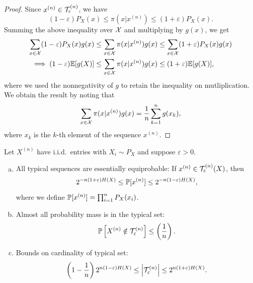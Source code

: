 \documentclass[11pt,a4paper]{article}
\begin{document}
\begin{proof}
    Since $x^{(n)}\in\mathcal{T}^{(n)}_\varepsilon$, we have
    \begin{equation*}
        (1-\varepsilon) P_X(x) \le \pi(x|x^{(n)}) \le (1+\varepsilon) P_X(x).
    \end{equation*}
    Summing the above inequality over $\mathcal{X}$ and multiplying by $g(x)$, we get 
    \begin{align*}
        \sum_{x\in\mathcal{X}} (1-\varepsilon) P_X(x) g(x) &\le \sum_{x\in\mathcal{X}} \pi(x|x^{(n)}) g(x) \le \sum_{x\in\mathcal{X}} (1+\varepsilon) P_X(x) g(x) \\
        \implies (1-\varepsilon) \mathbb{E}[g(X)] &\le \sum_{x\in\mathcal{X}} \pi(x|x^{(n)}) g(x) \le (1+\varepsilon) \mathbb{E}[g(X)],
    \end{align*} 
    where we used the nonnegativity of $g$ to retain the inequality on mutliplication. We obtain the result by noting that
    \begin{equation*}
        \sum_{x\in\mathcal{X}} \pi(x|x^{(n)}) g(x) = \dfrac{1}{n} \sum_{k=1}^n g(x_k),
    \end{equation*}
    where $x_k$ is the $k$-th element of the sequence $x^{(n)}$.
\end{proof}

\begin{theorem}\label{thm:typicality}
    Let $X^{(n)}$ have i.i.d.~entries with $X_i\sim P_X$ and suppose $\varepsilon>0$.
    \begin{enumerate}[(a)]
        \item All typical sequences are essentially equiprobable: If $x^{(n)}\in\mathcal{T}^{(n)}_\varepsilon(X)$, then 
        \begin{equation*}
            2^{-n(1+\varepsilon)H(X)} \le \mathbb{P}[x^{(n)}] \le 2^{-n(1-\varepsilon)H(X)},
        \end{equation*}
        where we define $\mathbb{P}[x^{(n)}] = \prod_{i=1}^{n} P_X(x_i)$.
        \item Almost all probability mass is in the typical set: 
        \begin{equation*}\label{eqn:not_in_typical_set}
            \mathbb{P}\left[ X^{(n)} \notin \mathcal{T}^{(n)}_\varepsilon \right] \le \left(\dfrac{1}{n}\right).
        \end{equation*}
        \item Bounds on cardinality of typical set:
        \begin{equation*}\label{eqn:typical_set_cardinality}
            \left(1-\dfrac{1}{n}\right) 2^{n(1-\varepsilon)H(X)} \le \left| \mathcal{T}^{(n)}_\varepsilon \right| \le 2^{n(1+\varepsilon)H(X)}.
        \end{equation*}
    \end{enumerate}
\end{theorem}
\end{document}
